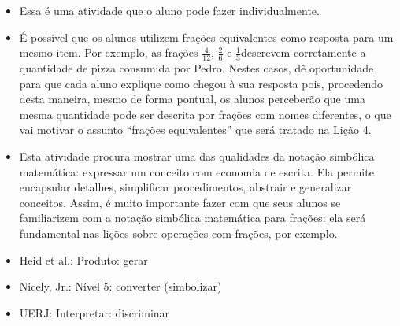   \vspace{.1cm}

  \vspace{.1cm}

  \begin{itemize} %
    \item       Essa é uma atividade que o aluno pode fazer individualmente.
    \item       É possível que os alunos utilizem frações equivalentes como resposta para um mesmo item. Por exemplo, as frações       $\frac{4}{12}$,       $\frac{2}{6}$ e       $\frac{1}{3}$descrevem corretamente a quantidade de pizza consumida por Pedro. Nestes casos, dê oportunidade para que cada aluno explique como chegou à sua resposta pois, procedendo desta maneira, mesmo de forma pontual, os alunos perceberão que uma mesma quantidade pode ser descrita por frações com nomes diferentes, o que vai motivar o assunto ``frações equivalentes''     que será tratado na Lição 4.
    \item       Esta atividade procura mostrar uma das qualidades da notação simbólica matemática: expressar um conceito com economia de escrita. Ela permite encapsular detalhes, simplificar procedimentos, abstrair e generalizar conceitos. Assim, é muito importante fazer com que seus alunos se familiarizem com a notação simbólica matemática para frações: ela será fundamental nas lições sobre operações com frações, por exemplo.
\end{itemize} %


  \vspace{.1cm}

 \vspace{.1cm}
\begin{itemize} %
    \item       Heid et al.: Produto: gerar
    \item       Nicely, Jr.: Nível 5: converter (simbolizar)
    \item       UERJ: Interpretar: discriminar
\end{itemize} %


%

